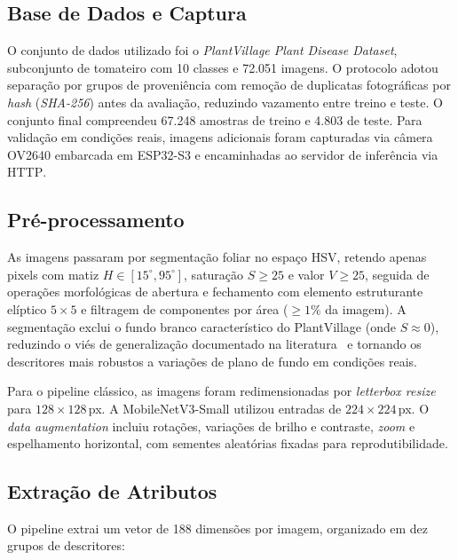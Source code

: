\documentclass[kdmile,a4paper]{kdmile}
\providecommand{\gls}[1]{\textnormal{\textsc{#1}}}
\begin{document}
\subsection{Base de Dados e Captura}

O conjunto de dados utilizado foi o \textit{PlantVillage Plant Disease Dataset},
subconjunto de tomateiro com 10 classes e 72.051 imagens. O protocolo adotou
separação por grupos de proveniência com remoção de duplicatas fotográficas por
\textit{hash} (\textit{SHA-256}) antes da avaliação, reduzindo vazamento entre
treino e teste. O conjunto final compreendeu 67.248 amostras de treino e 4.803
de teste. Para validação em condições reais, imagens adicionais foram capturadas
via câmera \gls{OV2640} embarcada em \gls{ESP32}-S3 e encaminhadas ao servidor
de inferência via \gls{HTTP}.

\subsection{Pré-processamento}

As imagens passaram por segmentação foliar no espaço \gls{HSV}, retendo apenas
pixels com matiz $H \in [15^\circ, 95^\circ]$, saturação $S \geq 25$ e valor
$V \geq 25$, seguida de operações morfológicas de abertura e fechamento com
elemento estruturante elíptico $5\times5$ e filtragem de componentes por área
($\geq 1\%$ da imagem). A segmentação exclui o fundo branco característico do
PlantVillage (onde $S \approx 0$), reduzindo o viés de generalização
documentado na literatura~\cite{mohanty2016deep} e tornando os descritores
mais robustos a variações de plano de fundo em condições reais.

Para o pipeline clássico, as imagens foram redimensionadas por
\textit{letterbox resize} para $128\times128$\,px. A MobileNetV3-Small utilizou
entradas de $224\times224$\,px. O \textit{data augmentation} incluiu rotações,
variações de brilho e contraste, \textit{zoom} e espelhamento horizontal, com
sementes aleatórias fixadas para reprodutibilidade.

\subsection{Extração de Atributos}

O pipeline extrai um vetor de 188 dimensões por imagem, organizado em dez
grupos de descritores:
\end{document}
